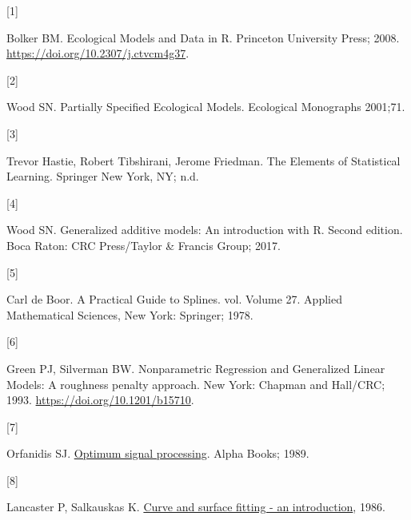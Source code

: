 \documentclass[
11pt, %
oneside, %
english, %
singlespacing, %
]{macthesis} %
\newlength{\cslhangindent}
\newlength{\csllabelwidth}
\newenvironment{CSLReferences}[2] %
{\begin{list}{}{%
	\setlength{\itemindent}{0pt}
	\setlength{\leftmargin}{0pt}
	\setlength{\parsep}{0pt}
	\ifodd #1
	\setlength{\leftmargin}{\cslhangindent}
	\setlength{\itemindent}{-1\cslhangindent}
	\fi
	\setlength{\itemsep}{#2\baselineskip}}}
{\end{list}}
\newcommand{\CSLLeftMargin}[1]{\parbox[t]{\csllabelwidth}{\strut#1\strut}}
\newcommand{\CSLRightInline}[1]{\parbox[t]{\linewidth - \csllabelwidth}{\strut#1\strut}}
\begin{document}

\noindent

\setlength{\parindent}{-0.20in}
\setlength{\leftskip}{0.20in}
\setlength{\parskip}{8pt}

\label{refs}
\begin{CSLReferences}{0}{0}
\CSLLeftMargin{{[}1{]} }%
\CSLRightInline{Bolker BM. Ecological {Models} and {Data} in {R}. Princeton University Press; 2008. \url{https://doi.org/10.2307/j.ctvcm4g37}.}

\CSLLeftMargin{{[}2{]} }%
\CSLRightInline{Wood SN. Partially {Specified Ecological Models}. Ecological Monographs 2001;71.}

\CSLLeftMargin{{[}3{]} }%
\CSLRightInline{Trevor Hastie, Robert Tibshirani, Jerome Friedman. The {Elements} of {Statistical Learning}. Springer New York, NY; n.d.}

\CSLLeftMargin{{[}4{]} }%
\CSLRightInline{Wood SN. Generalized additive models: An introduction with {R}. Second edition. Boca Raton: CRC Press/Taylor \& Francis Group; 2017.}

\CSLLeftMargin{{[}5{]} }%
\CSLRightInline{Carl de Boor. A {Practical Guide} to {Splines}. vol. Volume 27. Applied Mathematical Sciences, New York: Springer; 1978.}

\CSLLeftMargin{{[}6{]} }%
\CSLRightInline{Green PJ, Silverman BW. Nonparametric {Regression} and {Generalized Linear Models}: {A} roughness penalty approach. New York: {Chapman and Hall/CRC}; 1993. \url{https://doi.org/10.1201/b15710}.}

\CSLLeftMargin{{[}7{]} }%
\CSLRightInline{Orfanidis SJ. \href{https://books.google.ca/books?id=rrJ5AAAACAAJ}{Optimum signal processing}. Alpha Books; 1989.}

\CSLLeftMargin{{[}8{]} }%
\CSLRightInline{Lancaster P, Salkauskas K. \href{https://www.semanticscholar.org/paper/Curve-and-surface-fitting-an-introduction-Lancaster-Salkauskas/4a9d7f41851cdec947175a22fde29037a8eabd45}{Curve and surface fitting - an introduction}, 1986.}


\end{CSLReferences}
\end{document}
